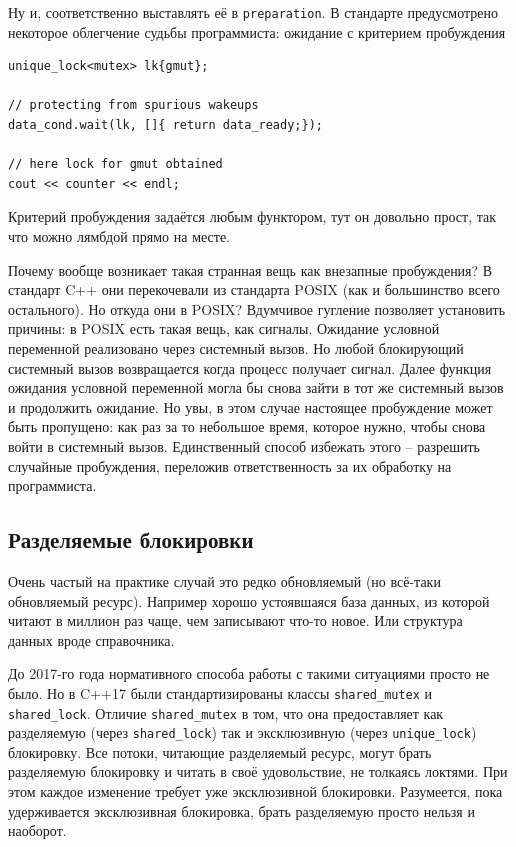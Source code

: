 \documentclass[a4paper,12pt,oneside]{book}
\begin{document}
Ну и, соответственно выставлять её в \lstinline!preparation!. В стандарте предусмотрено некоторое облегчение судьбы программиста: ожидание с критерием пробуждения

\begin{lstlisting}
unique_lock<mutex> lk{gmut};

// protecting from spurious wakeups
data_cond.wait(lk, []{ return data_ready;});

// here lock for gmut obtained
cout << counter << endl;
\end{lstlisting}

Критерий пробуждения задаётся любым функтором, тут он довольно прост, так что можно лямбдой прямо на месте.

Почему вообще возникает такая странная вещь как внезапные пробуждения? В стандарт C++ они перекочевали из стандарта POSIX (как и большинство всего остального). Но откуда они в POSIX? Вдумчивое гугление позволяет установить причины: в POSIX есть такая вещь, как сигналы. Ожидание условной переменной реализовано через системный вызов. Но любой блокирующий системный вызов возвращается когда процесс получает сигнал. Далее функция ожидания условной переменной могла бы снова зайти в тот же системный вызов и продолжить ожидание. Но увы, в этом случае настоящее пробуждение может быть пропущено: как раз за то небольшое время, которое нужно, чтобы снова войти в системный вызов. Единственный способ избежать этого -- разрешить случайные пробуждения, переложив ответственность за их обработку на программиста.

\subsection{Разделяемые блокировки}\label{sub:sharedlocks}

Очень частый на практике случай это редко обновляемый (но всё-таки обновляемый ресурс). Например хорошо устоявшаяся база данных, из которой читают в миллион раз чаще, чем записывают что-то новое. Или структура данных вроде справочника.

До 2017-го года нормативного способа работы с такими ситуациями просто не было. Но в C++17 были стандартизированы классы \lstinline!shared_mutex! и \lstinline!shared_lock!. Отличие \lstinline!shared_mutex! в том, что она предоставляет как разделяемую (через \lstinline!shared_lock!) так и эксклюзивную (через \lstinline!unique_lock!) блокировку. Все потоки, читающие разделяемый ресурс, могут брать разделяемую блокировку и читать в своё удовольствие, не толкаясь локтями. При этом каждое изменение требует уже эксклюзивной блокировки. Разумеется, пока удерживается эксклюзивная блокировка, брать разделяемую просто нельзя и наоборот.
\end{document}
